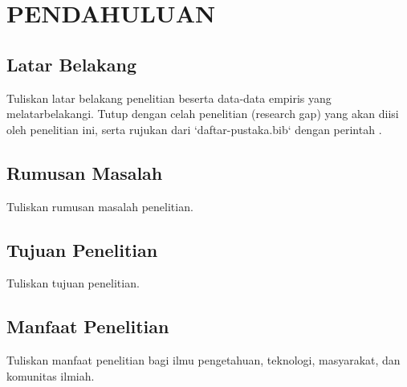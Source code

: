 %
\chapter{PENDAHULUAN}


\section{Latar Belakang}

Tuliskan latar belakang penelitian beserta data-data empiris yang
melatarbelakangi. Tutup dengan celah penelitian (research gap) yang akan
diisi oleh penelitian ini, serta rujukan dari `daftar-pustaka.bib`
dengan perintah \cite{buku2020}.

\section{Rumusan Masalah}

Tuliskan rumusan masalah penelitian.

\section{Tujuan Penelitian}

Tuliskan tujuan penelitian.

\section{Manfaat Penelitian}

Tuliskan manfaat penelitian bagi ilmu pengetahuan, teknologi, masyarakat,
dan komunitas ilmiah.
